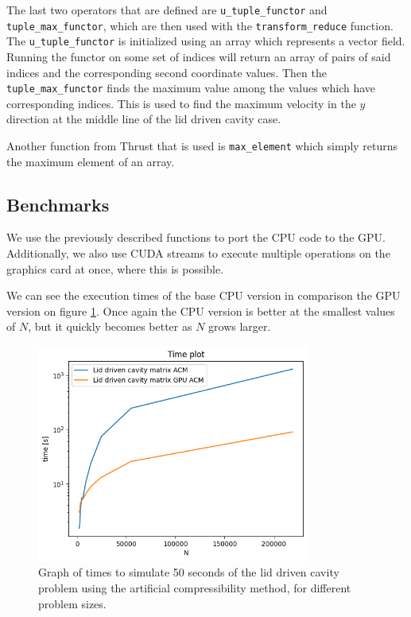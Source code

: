 \documentclass{article}
\begin{document}
The last two operators that are defined are \verb|u_tuple_functor| and \verb|tuple_max_functor|,
which are then used with the \verb|transform_reduce| function. The \verb|u_tuple_functor| is initialized
using an array which represents a vector field. Running the functor on some set of indices
will return an array of pairs of said indices and the corresponding second coordinate values.
Then the \verb|tuple_max_functor| finds the maximum value among the values which have corresponding 
indices. This is used to find 
the maximum velocity in the \(y\) direction at the middle line of the lid driven cavity case.

Another function from Thrust that is used is \verb|max_element| which simply returns the 
maximum element of an array.
\subsection{Benchmarks}
We use the previously described functions to port the CPU code to the GPU. Additionally,
we also use CUDA streams to execute multiple operations on the graphics card at once, where 
this is possible. 

We can see the execution times of the base CPU version in comparison the GPU version on figure 
\ref{fig:lidDrivenACM_time}.
Once again the CPU version is better at the smallest values of \(N\), but it quickly becomes 
better as \(N\) grows larger.
\begin{figure}[h!] 
    \centering 
    \includegraphics[width=0.8\textwidth]{plots/lidDrivenACM_time.png} 
    \caption{Graph of times to simulate 50 seconds of the lid driven cavity problem using
    the artificial compressibility method, for different problem sizes.} 
    \label{fig:lidDrivenACM_time} 
\end{figure}
\end{document}
